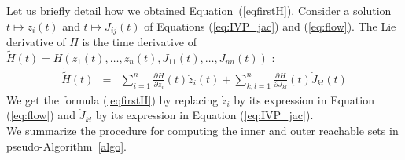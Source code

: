 \documentclass{sig-alternate-05-2015}
\begin{document}
Let us briefly detail how we obtained Equation~(\ref{eqfirstH}).
Consider a solution $t \mapsto z_i(t)$ and $t \mapsto J_{ij}(t)$ of
Equations (\ref{eq:IVP_jac}) and (\ref{eq:flow}). The Lie derivative of $H$
is
the time derivative of $\tilde{H}(t)=H(z_1(t),\ldots,z_n(t),J_{11}(t),\ldots,J_{nn}(t))$ : 
$$\begin{array}{rcl}
\dot{\tilde{H}}(t) & = & \sum\limits_{i=1}^{n} \frac{\partial H}{\partial z_i}(t)
\dot{z}_i(t)+\sum\limits_{k,l=1}^n \frac{\partial H}{\partial J_{kl}}(t) \dot{J}_{kl}(t)
\end{array}$$
We get the formula (\ref{eqfirstH}) by 
replacing $\dot{z}_i$ by its expression in Equation (\ref{eq:flow}) and
$\dot{J}_{kl}$ by its expression in Equation (\ref{eq:IVP_jac}). \\

We summarize the procedure for computing the inner and outer reachable sets 
 in pseudo-Algorithm~\ref{algo}.


\end{document}
